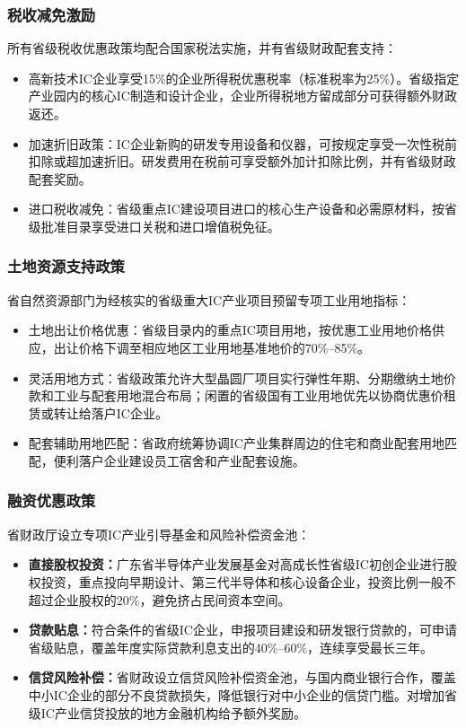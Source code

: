 \documentclass[12pt,a4paper]{article}
\begin{document}
\subsubsection{税收减免激励}

所有省级税收优惠政策均配合国家税法实施，并有省级财政配套支持：

\begin{itemize}
    \item 高新技术IC企业享受15\%的企业所得税优惠税率（标准税率为25\%）。省级指定产业园内的核心IC制造和设计企业，企业所得税地方留成部分可获得额外财政返还。
    \item 加速折旧政策：IC企业新购的研发专用设备和仪器，可按规定享受一次性税前扣除或超加速折旧。研发费用在税前可享受额外加计扣除比例，并有省级财政配套奖励。
    \item 进口税收减免：省级重点IC建设项目进口的核心生产设备和必需原材料，按省级批准目录享受进口关税和进口增值税免征。
\end{itemize}

\subsubsection{土地资源支持政策}

省自然资源部门为经核实的省级重大IC产业项目预留专项工业用地指标：

\begin{itemize}
    \item 土地出让价格优惠：省级目录内的重点IC项目用地，按优惠工业用地价格供应，出让价格下调至相应地区工业用地基准地价的70\%--85\%。
    \item 灵活用地方式：省级政策允许大型晶圆厂项目实行弹性年期、分期缴纳土地价款和工业与配套用地混合布局；闲置的省级国有工业用地优先以协商优惠价租赁或转让给落户IC企业。
    \item 配套辅助用地匹配：省政府统筹协调IC产业集群周边的住宅和商业配套用地匹配，便利落户企业建设员工宿舍和产业配套设施。
\end{itemize}

\subsubsection{融资优惠政策}

省财政厅设立专项IC产业引导基金和风险补偿资金池：

\begin{itemize}
    \item \textbf{直接股权投资：}广东省半导体产业发展基金对高成长性省级IC初创企业进行股权投资，重点投向早期设计、第三代半导体和核心设备企业，投资比例一般不超过企业股权的20\%，避免挤占民间资本空间。
    \item \textbf{贷款贴息：}符合条件的省级IC企业，申报项目建设和研发银行贷款的，可申请省级贴息，覆盖年度实际贷款利息支出的40\%--60\%，连续享受最长三年。
    \item \textbf{信贷风险补偿：}省财政设立信贷风险补偿资金池，与国内商业银行合作，覆盖中小IC企业的部分不良贷款损失，降低银行对中小企业的信贷门槛。对增加省级IC产业信贷投放的地方金融机构给予额外奖励。
\end{itemize}
\end{document}
